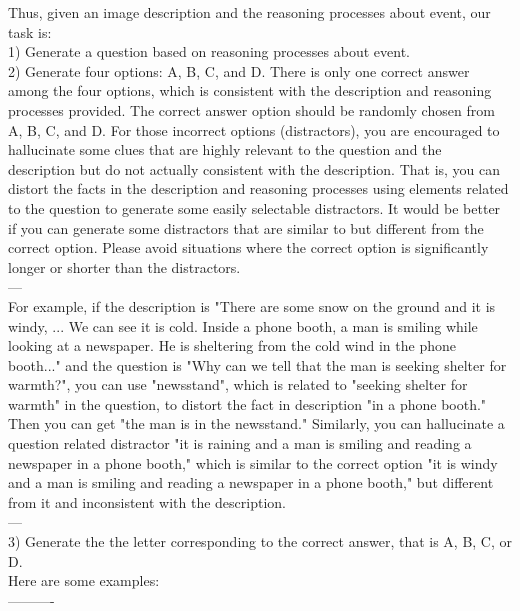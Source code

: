 \begin{figure*}[h]
\begin{tcolorbox}
    Thus, given an image description and the reasoning processes about event, our task is: \\
    1) Generate a question based on reasoning processes about event. \\
    2) Generate four options: A, B, C, and D. There is only one correct answer among the four options, which is consistent with the description and reasoning processes provided. The correct answer option should be randomly chosen from A, B, C, and D. For those incorrect options (distractors), you are encouraged to hallucinate some clues that are highly relevant to the question and the description but do not actually consistent with the description. That is, you can distort the facts in the description and reasoning processes using elements related to the question to generate some easily selectable distractors. It would be better if you can generate some distractors that are similar to but different from the correct option. Please avoid situations where the correct option is significantly longer or shorter than the distractors. \\
    --- \\
    For example, if the description is "There are some snow on the ground and it is windy, ... We can see it is cold. Inside a phone booth, a man is smiling while looking at a newspaper. He is sheltering from the cold wind in the phone booth..." and the question is "Why can we tell that the man is seeking shelter for warmth?", you can use "newsstand", which is related to "seeking shelter for warmth" in the question, to distort the fact in description "in a phone booth." Then you can get "the man is in the newsstand." Similarly, you can hallucinate a question related distractor "it is raining and a man is smiling and reading a newspaper in a phone booth," which is similar to the correct option "it is windy and a man is smiling and reading a newspaper in a phone booth," but different from it and inconsistent with the description.  \\
    --- \\
    3) Generate the the letter corresponding to the correct answer, that is A, B, C, or D.\\

    Here are some examples: \\
    ---------- \\
    

\end{tcolorbox}
\end{figure*}
